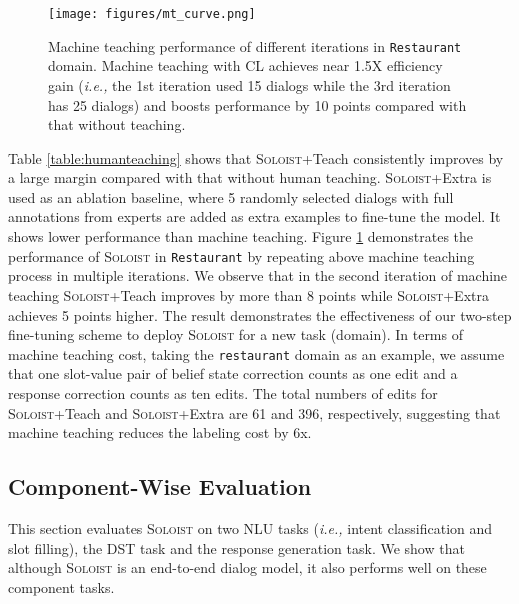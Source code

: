 \documentclass[11pt,a4paper]{article}
\newcommand{\ie}[0]{\emph{i.e., }}
\newcommand{\model}{\textsc{Soloist}}
\begin{document}
\begin{figure}[t]
\centering
\texttt{[image: figures/mt\_curve.png]}
\caption{Machine teaching performance of different iterations in \texttt{Restaurant} domain. Machine teaching with CL achieves near 1.5X efficiency gain (\ie the 1st iteration used 15 dialogs while the 3rd iteration has 25 dialogs) and boosts performance by 10 points compared with that without teaching.}
\label{fig:mt_curve}
\vspace{-5mm}
\end{figure} 

Table \ref{table:humanteaching} shows that {\model{}+Teach} consistently improves  by a large margin compared with that without human teaching. 
{\model{}+Extra} is used as an ablation baseline, where 5 randomly selected dialogs with full annotations from experts are added as extra examples to fine-tune the model. It shows lower performance than machine teaching. Figure \ref{fig:mt_curve} demonstrates the performance of \model{} in \texttt{Restaurant} by repeating above machine teaching process in multiple iterations. We observe that in the second iteration of machine teaching {\model{}+Teach} improves  by more than 8 points while {\model{}+Extra} achieves 5 points higher. The result demonstrates the effectiveness of our two-step fine-tuning scheme to deploy \model{} for a new task (domain). In terms of machine teaching cost, taking the \texttt{restaurant} domain as an example, we assume that one slot-value pair of belief state correction counts as one edit and a response correction counts as ten edits. The total numbers of edits for {\model{}+Teach} and {\model{}+Extra} are 61 and 396, respectively, suggesting that machine teaching reduces the labeling cost by 6x.

\subsection{Component-Wise Evaluation}
This section evaluates \model{} on two NLU tasks (\ie intent classification and slot filling), the DST task and the response generation task. We show that although \model{} is an end-to-end dialog model, it also performs well on these component tasks.
\end{document}

